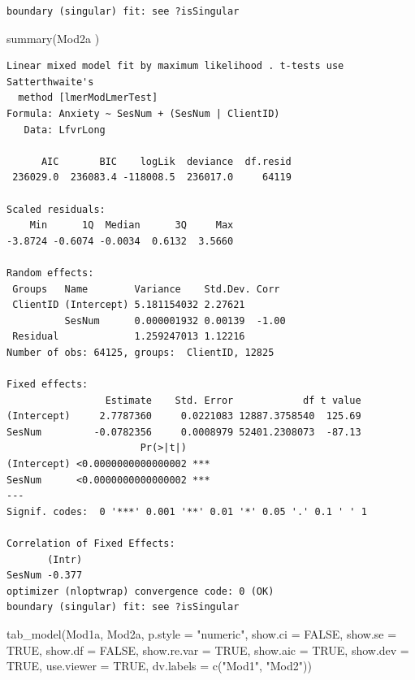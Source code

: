 \documentclass[
  11pt,
]{book}
\newenvironment{Shaded}{\begin{snugshade}}{\end{snugshade}}
\newcommand{\AttributeTok}[1]{\textcolor[rgb]{0.77,0.63,0.00}{#1}}
\newcommand{\ConstantTok}[1]{\textcolor[rgb]{0.00,0.00,0.00}{#1}}
\newcommand{\FunctionTok}[1]{\textcolor[rgb]{0.00,0.00,0.00}{#1}}
\newcommand{\NormalTok}[1]{#1}
\newcommand{\StringTok}[1]{\textcolor[rgb]{0.31,0.60,0.02}{#1}}
\begin{document}
\begin{verbatim}
boundary (singular) fit: see ?isSingular
\end{verbatim}

\begin{Shaded}
\begin{Highlighting}[]
\FunctionTok{summary}\NormalTok{(Mod2a )}
\end{Highlighting}
\end{Shaded}

\begin{verbatim}
Linear mixed model fit by maximum likelihood . t-tests use Satterthwaite's
  method [lmerModLmerTest]
Formula: Anxiety ~ SesNum + (SesNum | ClientID)
   Data: LfvrLong

      AIC       BIC    logLik  deviance  df.resid 
 236029.0  236083.4 -118008.5  236017.0     64119 

Scaled residuals: 
    Min      1Q  Median      3Q     Max 
-3.8724 -0.6074 -0.0034  0.6132  3.5660 

Random effects:
 Groups   Name        Variance    Std.Dev. Corr 
 ClientID (Intercept) 5.181154032 2.27621       
          SesNum      0.000001932 0.00139  -1.00
 Residual             1.259247013 1.12216       
Number of obs: 64125, groups:  ClientID, 12825

Fixed effects:
                 Estimate    Std. Error            df t value
(Intercept)     2.7787360     0.0221083 12887.3758540  125.69
SesNum         -0.0782356     0.0008979 52401.2308073  -87.13
                       Pr(>|t|)    
(Intercept) <0.0000000000000002 ***
SesNum      <0.0000000000000002 ***
---
Signif. codes:  0 '***' 0.001 '**' 0.01 '*' 0.05 '.' 0.1 ' ' 1

Correlation of Fixed Effects:
       (Intr)
SesNum -0.377
optimizer (nloptwrap) convergence code: 0 (OK)
boundary (singular) fit: see ?isSingular
\end{verbatim}

\begin{Shaded}
\begin{Highlighting}[]
\FunctionTok{tab\_model}\NormalTok{(Mod1a, Mod2a, }\AttributeTok{p.style =} \StringTok{"numeric"}\NormalTok{, }\AttributeTok{show.ci =} \ConstantTok{FALSE}\NormalTok{, }\AttributeTok{show.se =} \ConstantTok{TRUE}\NormalTok{, }\AttributeTok{show.df =} \ConstantTok{FALSE}\NormalTok{, }\AttributeTok{show.re.var =} \ConstantTok{TRUE}\NormalTok{, }\AttributeTok{show.aic =} \ConstantTok{TRUE}\NormalTok{, }\AttributeTok{show.dev =} \ConstantTok{TRUE}\NormalTok{, }\AttributeTok{use.viewer =} \ConstantTok{TRUE}\NormalTok{, }\AttributeTok{dv.labels =} \FunctionTok{c}\NormalTok{(}\StringTok{"Mod1"}\NormalTok{, }\StringTok{"Mod2"}\NormalTok{))}
\end{Highlighting}
\end{Shaded}
\end{document}
